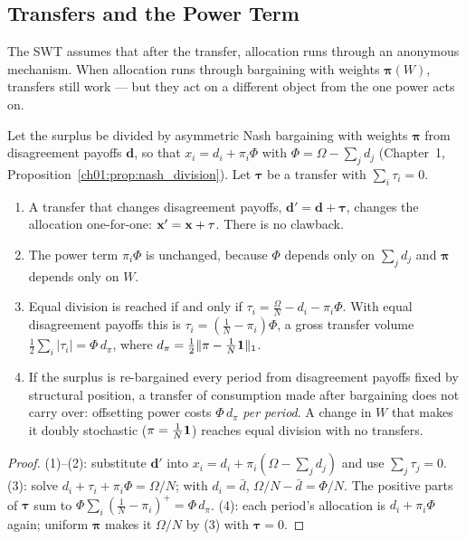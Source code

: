 \documentclass[../structural_economics_book.tex]{subfiles}
\begin{document}
\subsection{Transfers and the Power Term}

The SWT assumes that after the transfer, allocation runs through an anonymous mechanism. When allocation runs through bargaining with weights $\boldsymbol{\pi}(W)$, transfers still work --- but they act on a different object from the one power acts on.

\begin{proposition}\label{ch02:thm:transfer_trap}
Let the surplus be divided by asymmetric Nash bargaining with weights $\boldsymbol{\pi}$ from disagreement payoffs $\mathbf{d}$, so that $x_i = d_i + \pi_i\Phi$ with $\Phi = \Omega - \sum_j d_j$ (Chapter~1, Proposition~\ref{ch01:prop:nash_division}). Let $\boldsymbol{\tau}$ be a transfer with $\sum_i \tau_i = 0$.
\begin{enumerate}
\item A transfer that changes disagreement payoffs, $\mathbf{d}' = \mathbf{d} + \boldsymbol{\tau}$, changes the allocation one-for-one: $\mathbf{x}' = \mathbf{x} + \tau$. There is no clawback.
\item The power term $\pi_i\Phi$ is unchanged, because $\Phi$ depends only on $\sum_j d_j$ and $\boldsymbol{\pi}$ depends only on $W$.
\item Equal division is reached if and only if $\tau_i = \frac{\Omega}{N} - d_i - \pi_i\Phi$. With equal disagreement payoffs this is $\tau_i = (\frac{1}{N} - \pi_i)\Phi$, a gross transfer volume $\frac{1}{2}\sum_i|\tau_i| = \Phi\,d_\pi$, where $d_\pi = \frac{1}{2}\|\pi - \frac{1}{N}\mathbf{1}\|_1$.
\item If the surplus is re-bargained every period from disagreement payoffs fixed by structural position, a transfer of consumption made after bargaining does not carry over: offsetting power costs $\Phi\,d_\pi$ \textit{per period}. A change in $W$ that makes it doubly stochastic ($\pi = \frac{1}{N}\mathbf{1}$) reaches equal division with no transfers.
\end{enumerate}
\end{proposition}

\begin{proof}
(1)--(2): substitute $\mathbf{d}'$ into $x_i = d_i + \pi_i(\Omega - \sum_j d_j)$ and use $\sum_j \tau_j = 0$. (3): solve $d_i + \tau_i + \pi_i\Phi = \Omega/N$; with $d_i = \bar d$, $\Omega/N - \bar d = \Phi/N$. The positive parts of $\boldsymbol{\tau}$ sum to $\Phi\sum_i(\frac1N - \pi_i)^+ = \Phi\,d_\pi$. (4): each period's allocation is $d_i + \pi_i\Phi$ again; uniform $\boldsymbol{\pi}$ makes it $\Omega/N$ by (3) with $\boldsymbol{\tau} = 0$.
\end{proof}
\end{document}
